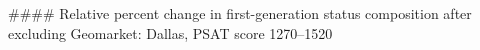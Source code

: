 #### Relative percent change in first-generation status composition after excluding Geomarket: Dallas, PSAT score 1270–1520
